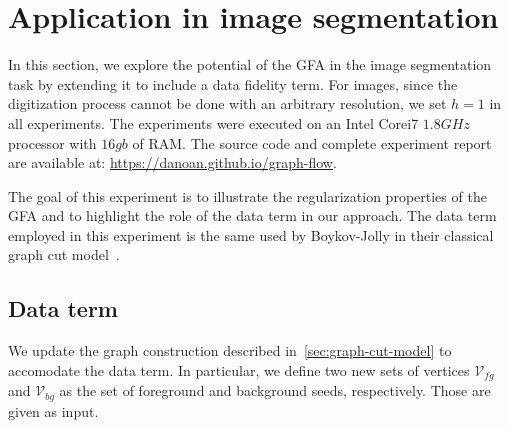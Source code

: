 \documentclass{siamart220329}
\begin{document}



\section{Application in image segmentation}
In this section, we explore the potential of the GFA in the image segmentation
task by extending it to include a data fidelity term. For images,
since the digitization process cannot be done with an arbitrary resolution, we
set $h=1$ in all experiments. The experiments were executed on an Intel Corei7
$1.8GHz$ processor with $16gb$ of RAM. The source code and complete experiment
report are available at: \url{https://danoan.github.io/graph-flow}.

The goal of this experiment is to illustrate the regularization properties of
the GFA and to highlight the role of the data term in our approach. The data
term employed in this experiment is the same used by Boykov-Jolly in their
classical graph cut model~\cite{boykov01graphcut}.

\subsection{Data term}
We update the graph construction described in~\cref{sec:graph-cut-model} to
accomodate the data term. In particular, we define two new sets of vertices
$\mathcal{V}_{fg}$ and $\mathcal{V}_{bg}$ as the set of foreground and
background seeds, respectively. Those are given as input.
\end{document}
